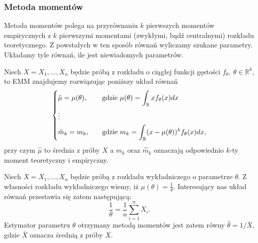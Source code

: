 \subsubsection{Metoda momentów}
	Metoda momentów polega na przyrównaniu $k$ pierwszych momentów empirycznych z $k$ pierwszymi momentami (zwykłymi, bądź centralnymi) rozkładu teoretycznego. Z powstałych w ten sposób równań wyliczamy szukane parametry. Układamy tyle równań, ile jest niewiadomych parametrów.
	
	\begin{przyk}
			Niech $X = X_1, \ldots, X_n$ będzie próbą z rozkładu o ciągłej funkcji gęstości $f_{\theta}, \ \theta \in \mathbb{R}^k$, to EMM znajdujemy rozwiązując poniższy układ równań
		\begin{equation}
			\begin{dcases}
			\hat{\mu}  = \mu(\theta), \quad &\text{gdzie} \  \mu(\theta) = \int_{\mathbb{R}} x f_{\theta}(x)dx \\
			\vdots\\
			\hat{m}_k  = m_k, \quad &\text{gdzie} \  m_k = \int_{\mathbb{R}} (x - \mu(\theta))^k f_{\theta}(x)dx, \\
			\end{dcases}
		\end{equation}
		przy czym $\hat{\mu}$ to średnia z próby $X$ a $m_k$ oraz $\hat{m}_k$ oznaczają odpowiednio $k$-ty moment teoretyczny i empiryczny.
	\end{przyk}

	

	\begin{przyk}
	Niech $X = X_1, \ldots, X_n$ będzie próbą z rozkładu wykładniczego o parametrze $\theta$. Z własności rozkładu wykładniczego wiemy, iż $\mu(\theta) = \frac{1}{\theta}$. Interesujący nas układ równań przestawia się zatem następującą:
	\begin{equation*}
		\frac{1}{\theta} = \frac{1}{n} \sum_{i=1}^{n}X_i.
	\end{equation*}
	Estymator parametru $\theta$ otrzymany metodą momentów jest zatem równy $\hat{\theta} = 1/\bar{X}$, gdzie $\bar{X}$ oznacza średnią z próby $X$.
	\end{przyk}



